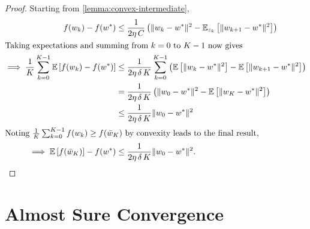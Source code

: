 \wgcConvexIndSmooth*

\begin{proof}
   Starting from \autoref{lemma:convex-intermediate},
   \begin{align*}
    f(w_k) - f(w^*) &\leq \frac{1}{2\eta \, C} \left(\|w_k - w^*\|^2 - \mathbb{E}_{z_{k}} \left[\|w_{k+1} - w^*\|^2\right]\right)\\
    \intertext{Taking expectations and summing from \( k = 0 \) to \( K - 1 \) now gives}
    \implies \frac{1}{K} \sum_{k=0}^{K -1} \mathbb{E} \left[f(w_k) - f(w^*)\right] &\leq \frac{1}{2\eta \, \delta \, K}\sum_{k=0}^{K-1}\left(\mathbb{E}\left[\|w_k - w^*\|^2\right] - \mathbb{E}\left[\|w_{k+1} - w^*\|^2\right]\right)\\
                                                         &= \frac{1}{2\eta \, \delta \, K}\left(\|w_0 - w^*\|^2 - \mathbb{E}\left[\|w_{K} - w^*\|^2\right]\right)\\
                                                         &\leq \frac{1}{2\eta \, \delta \, K} \|w_0 - w^*\|^2\\
\intertext{Noting \( \frac{1}{K}\sum_{k=0}^{K-1} f(w_k) \geq f(\bar {w}_K) \) by convexity leads to the final result,}
   \implies \mathbb{E}\left[f(\bar w_K)\right] - f(w^*) &\leq \frac{1}{2\eta \, \delta \, K}\|w_0 - w^*\|^2.
\end{align*}
\end{proof}


\section{Almost Sure Convergence}~\label{app:almost-sure-convergence}

